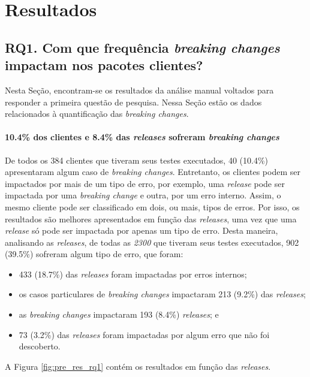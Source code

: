 \chapter{Resultados}
\label{cap:results}

\section{RQ1. Com que frequência \textit{breaking changes} impactam nos pacotes clientes?}

Nesta Seção, encontram-se os resultados da análise manual voltados para responder a primeira questão de pesquisa. Nessa Seção estão os dados relacionados à quantificação das \textit{breaking changes}.

\subsubsection{\textbf{10.4\% dos clientes e 8.4\% das \textit{releases} sofreram \textit{breaking changes}}}

De todos os 384 clientes que tiveram seus testes executados, 40 (10.4\%) apresentaram algum caso de \textit{breaking changes}. Entretanto, os clientes podem ser impactados por mais de um tipo de erro, por exemplo, uma \textit{release} pode ser impactada por uma \textit{breaking change} e outra, por um erro interno. Assim, o mesmo cliente pode ser classificado em dois, ou mais, tipos de erros. Por isso, os resultados são melhores apresentados em função das \textit{releases}, uma vez que uma \textit{release} só pode ser impactada por apenas um tipo de erro. Desta maneira, analisando as \textit{releases}, de todas as \textit{2300} que tiveram seus testes executados, 902 (39.5\%) sofreram algum tipo de erro, que foram:

\begin{itemize}
    \item 433 (18.7\%) das \textit{releases} foram impactadas por erros internos;
    \item os casos particulares de \textit{breaking changes} impactaram 213 (9.2\%) das \textit{releases};
    \item as \textit{breaking changes} impactaram 193 (8.4\%) \textit{releases}; e
    \item 73 (3.2\%) das \textit{releases} foram impactadas por algum erro que não foi descoberto.
\end{itemize}{}

A Figura \ref{fig:pre_res_rq1} contém os resultados em função das \textit{releases}.

